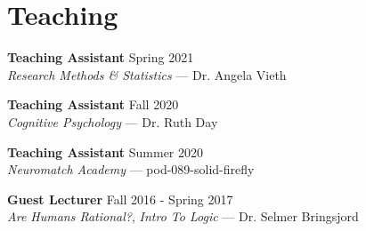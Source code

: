 \section{Teaching}
\textbf{Teaching Assistant} \hfill Spring 2021 \\
\emph{Research Methods \& Statistics} --- Dr. Angela Vieth

\textbf{Teaching Assistant} \hfill Fall 2020 \\
\emph{Cognitive Psychology} --- Dr. Ruth Day

\textbf{Teaching Assistant} \hfill Summer 2020 \\
\emph{Neuromatch Academy} --- pod-089-solid-firefly

\textbf{Guest Lecturer} \hfill Fall 2016 - Spring 2017 \\
\emph{Are Humans Rational?}, \emph{Intro To Logic} --- Dr. Selmer Bringsjord
